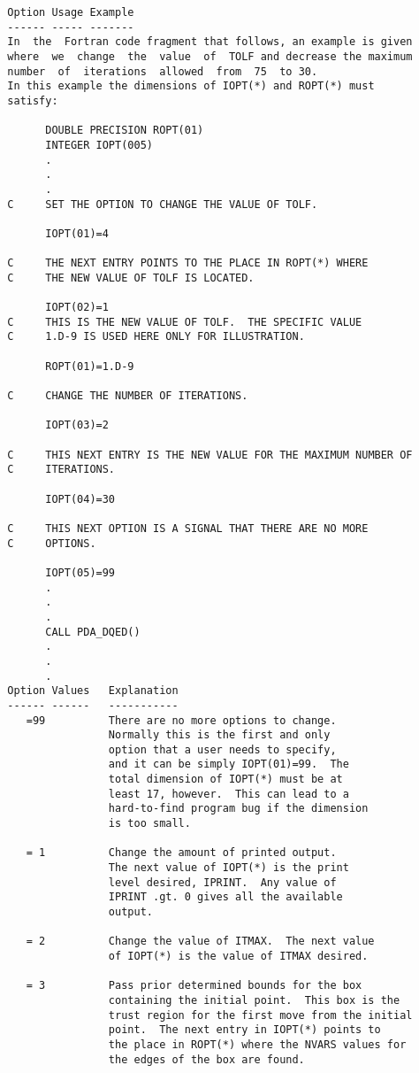 \begin{verbatim}
  Option Usage Example
  ------ ----- -------
  In  the  Fortran code fragment that follows, an example is given
  where  we  change  the  value  of  TOLF and decrease the maximum
  number  of  iterations  allowed  from  75  to 30.
  In this example the dimensions of IOPT(*) and ROPT(*) must
  satisfy:

        DOUBLE PRECISION ROPT(01)
        INTEGER IOPT(005)
        .
        .
        .
  C     SET THE OPTION TO CHANGE THE VALUE OF TOLF.

        IOPT(01)=4

  C     THE NEXT ENTRY POINTS TO THE PLACE IN ROPT(*) WHERE
  C     THE NEW VALUE OF TOLF IS LOCATED.

        IOPT(02)=1
  C     THIS IS THE NEW VALUE OF TOLF.  THE SPECIFIC VALUE
  C     1.D-9 IS USED HERE ONLY FOR ILLUSTRATION.

        ROPT(01)=1.D-9

  C     CHANGE THE NUMBER OF ITERATIONS.

        IOPT(03)=2

  C     THIS NEXT ENTRY IS THE NEW VALUE FOR THE MAXIMUM NUMBER OF
  C     ITERATIONS.

        IOPT(04)=30

  C     THIS NEXT OPTION IS A SIGNAL THAT THERE ARE NO MORE
  C     OPTIONS.

        IOPT(05)=99
        .
        .
        .
        CALL PDA_DQED()
        .
        .
        .
  Option Values   Explanation
  ------ ------   -----------
     =99          There are no more options to change.
                  Normally this is the first and only
                  option that a user needs to specify,
                  and it can be simply IOPT(01)=99.  The
                  total dimension of IOPT(*) must be at
                  least 17, however.  This can lead to a
                  hard-to-find program bug if the dimension
                  is too small.

     = 1          Change the amount of printed output.
                  The next value of IOPT(*) is the print
                  level desired, IPRINT.  Any value of
                  IPRINT .gt. 0 gives all the available
                  output.

     = 2          Change the value of ITMAX.  The next value
                  of IOPT(*) is the value of ITMAX desired.

     = 3          Pass prior determined bounds for the box
                  containing the initial point.  This box is the
                  trust region for the first move from the initial
                  point.  The next entry in IOPT(*) points to
                  the place in ROPT(*) where the NVARS values for
                  the edges of the box are found.


\end{verbatim}
